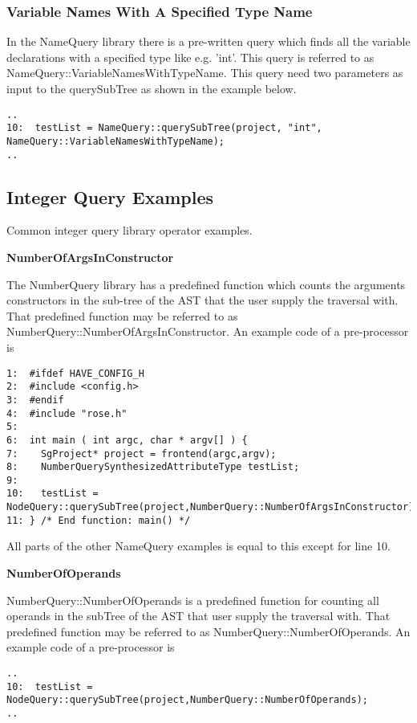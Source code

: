 {\subsubsection{Variable Names With A Specified Type Name}

In the NameQuery library there is a pre-written query which finds all
the variable declarations with a specified type like e.g. 'int'. This
query is referred to as NameQuery::VariableNamesWithTypeName. This
query need two parameters as input to the querySubTree as shown in the
example below.
\begin{verbatim}
..
10:  testList = NameQuery::querySubTree(project, "int", NameQuery::VariableNamesWithTypeName);
..
\end{verbatim}

\subsection{Integer Query Examples}
   Common integer query library operator examples.


\textbf{NumberOfArgsInConstructor}

The NumberQuery library has a predefined function which counts the arguments 
constructors in the sub-tree of the AST that the user supply the
traversal with. That predefined function may be referred to as
NumberQuery::NumberOfArgsInConstructor. An example code of a
pre-processor is
\begin{verbatim}
1:  #ifdef HAVE_CONFIG_H
2:  #include <config.h>
3:  #endif
4:  #include "rose.h"
5:
6:  int main ( int argc, char * argv[] ) {
7:    SgProject* project = frontend(argc,argv);
8:    NumberQuerySynthesizedAttributeType testList;
9: 	
10:   testList = NodeQuery::querySubTree(project,NumberQuery::NumberOfArgsInConstructor);
11: } /* End function: main() */
\end{verbatim}
All parts of the other NameQuery examples is equal to this except for line 10.

\textbf{NumberOfOperands}

NumberQuery::NumberOfOperands is a predefined function for counting
all operands in the subTree of the AST that user supply
the traversal with. That predefined function may be referred to as 
NumberQuery::NumberOfOperands. An example code of a pre-processor
is
\begin{verbatim}
..
10:  testList = NodeQuery::querySubTree(project,NumberQuery::NumberOfOperands);
..
\end{verbatim}

}
